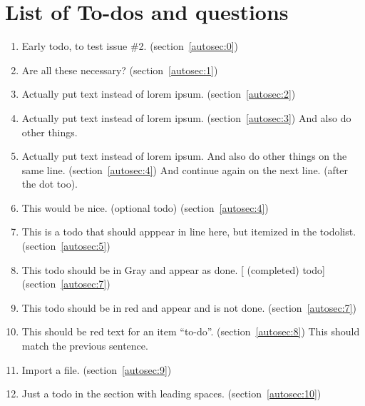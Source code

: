 \section{List of To-dos and questions}
    \begin{enumerate}[noitemsep]
        \item {\color{red}Early todo, to test issue \#2.} (section~\ref{autosec:0})
        \item {\color{ForestGreen}Are all these necessary?} (section~\ref{autosec:1})
        \item {\color{red}Actually put text instead of lorem ipsum.} (section~\ref{autosec:2})
        \item {\color{red}Actually put text instead of lorem ipsum.} (section~\ref{autosec:3})
{\color{red}And also do other things.}
        \item {\color{red}Actually put text instead of lorem ipsum. And also do other things on the same line.} (section~\ref{autosec:4})
{\color{red}And continue again on the next line. (after the dot too).}
        \item {\color{Orange}This would be nice. (optional todo)} (section~\ref{autosec:4})
        \item {\color{red}This is a todo that should apppear in line here, but itemized in the todolist.} (section~\ref{autosec:5})
        \item {\color{Gray}This todo should be in Gray and appear as done. [ (completed) todo]} (section~\ref{autosec:7})
        \item {\color{red}This todo should be in red and appear and is not done.} (section~\ref{autosec:7})
        \item {\color{red}This should be red text for an item ``to-do''.} (section~\ref{autosec:8})
{\color{red}This should match the previous sentence.}
        \item {\color{red}Import a file.} (section~\ref{autosec:9})
        \item {\color{red}Just a todo in the section with leading spaces.} (section~\ref{autosec:10})

\end{enumerate}
